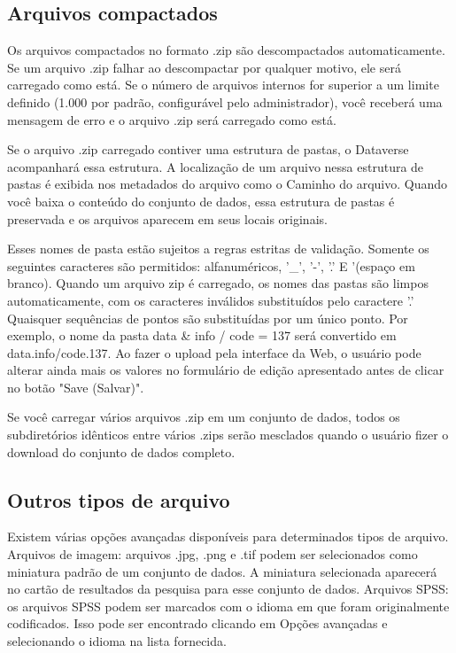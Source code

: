 \documentclass[12pt,hidelinks]{article}
\begin{document}
    \subsection{Arquivos compactados}
    
\qquad Os arquivos compactados no formato .zip são descompactados automaticamente. Se um arquivo .zip falhar ao descompactar por qualquer motivo, ele será carregado como está. Se o número de arquivos internos for superior a um limite definido (1.000 por padrão, configurável pelo administrador), você receberá uma mensagem de erro e o arquivo .zip será carregado como está.

Se o arquivo .zip carregado contiver uma estrutura de pastas, o Dataverse acompanhará essa estrutura. A localização de um arquivo nessa estrutura de pastas é exibida nos metadados do arquivo como o Caminho do arquivo. Quando você baixa o conteúdo do conjunto de dados, essa estrutura de pastas é preservada e os arquivos aparecem em seus locais originais.

Esses nomes de pasta estão sujeitos a regras estritas de validação. Somente os seguintes caracteres são permitidos: alfanuméricos, '\_', '-', '.' E '(espaço em branco). Quando um arquivo zip é carregado, os nomes das pastas são limpos automaticamente, com os caracteres inválidos substituídos pelo caractere '.' Quaisquer sequências de pontos são substituídas por um único ponto. Por exemplo, o nome da pasta data \& info / code = \@ 137 será convertido em data.info/code.137. Ao fazer o upload pela interface da Web, o usuário pode alterar ainda mais os valores no formulário de edição apresentado antes de clicar no botão "Save (Salvar)".

Se você carregar vários arquivos .zip em um conjunto de dados, todos os subdiretórios idênticos entre vários .zips serão mesclados quando o usuário fizer o download do conjunto de dados completo.
    
    \subsection{Outros tipos de arquivo}
    
\qquad Existem várias opções avançadas disponíveis para determinados tipos de arquivo. Arquivos de imagem: arquivos .jpg, .png e .tif podem ser selecionados como miniatura padrão de um conjunto de dados. A miniatura selecionada aparecerá no cartão de resultados da pesquisa para esse conjunto de dados.
Arquivos SPSS: os arquivos SPSS podem ser marcados com o idioma em que foram originalmente codificados. Isso pode ser encontrado clicando em Opções avançadas e selecionando o idioma na lista fornecida.    
    
\end{document}
